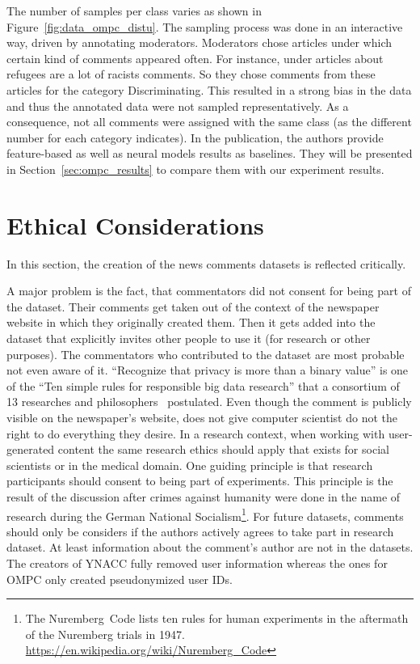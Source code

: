 The number of samples per class varies as shown in Figure~\ref{fig:data_ompc_distu}. The sampling process was done in an interactive way, driven by annotating moderators.
Moderators chose articles under which certain kind of comments appeared often.
For instance, under articles about refugees are a lot of racists comments. So they chose comments from these articles for the category Discriminating. This resulted in a strong bias in the data and thus the annotated data were not sampled representatively. As a consequence, not all comments were assigned with the same class (as the different number for each category indicates). In the publication, the authors provide feature-based as well as neural models results as baselines. They will be presented in Section~\ref{sec:ompc_results} to compare them with our experiment results.

\section{Ethical Considerations}

In this section, the creation of the news comments datasets is reflected critically.

A major problem is the fact, that commentators did not consent for being part of the dataset. Their comments get taken out of the context of the newspaper website in which they originally created them. Then it gets added into the dataset that explicitly invites other people to use it (for research or other purposes). The commentators who contributed to the dataset are most probable not even aware of it. ``Recognize that privacy is more than a binary value'' is one of the ``Ten simple rules for responsible big data research'' that a consortium of 13 researches and philosophers~\cite{DBLP:journals/ploscb/ZookBb0KGGH0MNN17} postulated.
Even though the comment is publicly visible on the newspaper's website, does not give computer scientist do not the right to do everything they desire.
In a research context, when working with user-generated content the same research ethics should apply that exists for social scientists or in the medical domain. One guiding principle is that research participants should consent to being part of experiments. This principle is the result of the discussion after crimes against humanity were done in the name of research during the German National Socialism\footnote{The Nuremberg~Code lists ten rules for human experiments in the aftermath of the Nuremberg trials in 1947. \url{https://en.wikipedia.org/wiki/Nuremberg_Code}}. For future datasets, comments should only be considers if the authors actively agrees to take part in research dataset.
At least information about the comment's author are not in the datasets.
The creators of YNACC fully removed user information whereas the ones for OMPC only created pseudonymized user IDs.

